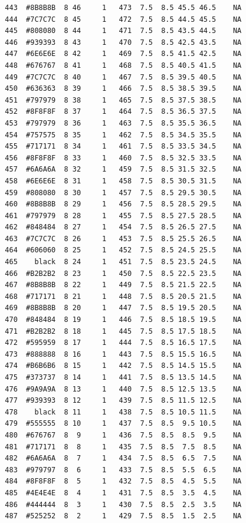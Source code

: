 \documentclass[12pt,twoside]{reedthesis}
\begin{document}
\begin{verbatim}
  443  #8B8B8B  8 46     1   473  7.5  8.5 45.5 46.5    NA
  444  #7C7C7C  8 45     1   472  7.5  8.5 44.5 45.5    NA
  445  #808080  8 44     1   471  7.5  8.5 43.5 44.5    NA
  446  #939393  8 43     1   470  7.5  8.5 42.5 43.5    NA
  447  #6E6E6E  8 42     1   469  7.5  8.5 41.5 42.5    NA
  448  #676767  8 41     1   468  7.5  8.5 40.5 41.5    NA
  449  #7C7C7C  8 40     1   467  7.5  8.5 39.5 40.5    NA
  450  #636363  8 39     1   466  7.5  8.5 38.5 39.5    NA
  451  #797979  8 38     1   465  7.5  8.5 37.5 38.5    NA
  452  #8F8F8F  8 37     1   464  7.5  8.5 36.5 37.5    NA
  453  #797979  8 36     1   463  7.5  8.5 35.5 36.5    NA
  454  #757575  8 35     1   462  7.5  8.5 34.5 35.5    NA
  455  #717171  8 34     1   461  7.5  8.5 33.5 34.5    NA
  456  #8F8F8F  8 33     1   460  7.5  8.5 32.5 33.5    NA
  457  #6A6A6A  8 32     1   459  7.5  8.5 31.5 32.5    NA
  458  #6E6E6E  8 31     1   458  7.5  8.5 30.5 31.5    NA
  459  #808080  8 30     1   457  7.5  8.5 29.5 30.5    NA
  460  #8B8B8B  8 29     1   456  7.5  8.5 28.5 29.5    NA
  461  #797979  8 28     1   455  7.5  8.5 27.5 28.5    NA
  462  #848484  8 27     1   454  7.5  8.5 26.5 27.5    NA
  463  #7C7C7C  8 26     1   453  7.5  8.5 25.5 26.5    NA
  464  #606060  8 25     1   452  7.5  8.5 24.5 25.5    NA
  465    black  8 24     1   451  7.5  8.5 23.5 24.5    NA
  466  #B2B2B2  8 23     1   450  7.5  8.5 22.5 23.5    NA
  467  #8B8B8B  8 22     1   449  7.5  8.5 21.5 22.5    NA
  468  #717171  8 21     1   448  7.5  8.5 20.5 21.5    NA
  469  #8B8B8B  8 20     1   447  7.5  8.5 19.5 20.5    NA
  470  #848484  8 19     1   446  7.5  8.5 18.5 19.5    NA
  471  #B2B2B2  8 18     1   445  7.5  8.5 17.5 18.5    NA
  472  #595959  8 17     1   444  7.5  8.5 16.5 17.5    NA
  473  #888888  8 16     1   443  7.5  8.5 15.5 16.5    NA
  474  #B6B6B6  8 15     1   442  7.5  8.5 14.5 15.5    NA
  475  #373737  8 14     1   441  7.5  8.5 13.5 14.5    NA
  476  #9A9A9A  8 13     1   440  7.5  8.5 12.5 13.5    NA
  477  #939393  8 12     1   439  7.5  8.5 11.5 12.5    NA
  478    black  8 11     1   438  7.5  8.5 10.5 11.5    NA
  479  #555555  8 10     1   437  7.5  8.5  9.5 10.5    NA
  480  #676767  8  9     1   436  7.5  8.5  8.5  9.5    NA
  481  #717171  8  8     1   435  7.5  8.5  7.5  8.5    NA
  482  #6A6A6A  8  7     1   434  7.5  8.5  6.5  7.5    NA
  483  #979797  8  6     1   433  7.5  8.5  5.5  6.5    NA
  484  #8F8F8F  8  5     1   432  7.5  8.5  4.5  5.5    NA
  485  #4E4E4E  8  4     1   431  7.5  8.5  3.5  4.5    NA
  486  #444444  8  3     1   430  7.5  8.5  2.5  3.5    NA
  487  #525252  8  2     1   429  7.5  8.5  1.5  2.5    NA

\end{verbatim}
\end{document}
